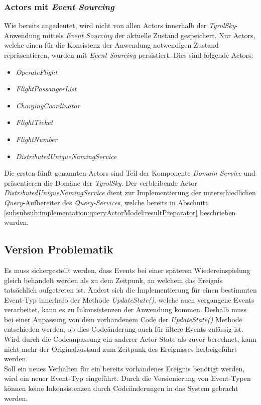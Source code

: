 \subsubsection{Actors mit \textit{Event Sourcing}}
Wie bereits angedeutet, wird nicht von allen Actors innerhalb der \textit{TyrolSky}-Anwendung mittels \textit{Event Sourcing} der aktuelle Zustand gespeichert. Nur Actors, welche einen für die Konsistenz der Anwendung notwendigen Zustand repräsentieren, wurden mit \textit{Event Sourcing} persistiert. Dies sind folgende Actors: 
\begin{itemize}
    \item{\textit{OperateFlight}}
    \item{\textit{FlightPassangerList}}
    \item{\textit{ChargingCoordinator}}
    \item{\textit{FlightTicket}}
    \item{\textit{FlightNumber}}
    \item{\textit{DistributedUniqueNamingService}}
\end{itemize}
Die ersten fünft genannten Actors sind Teil der Komponente \textit{Domain Service} und präsentieren die Domäne der \textit{TyrolSky}. Der verbleibende Actor \textit{DistributedUniqueNamingService} dient zur Implementierung der unterschiedlichen \textit{Query}-Aufbereiter des \textit{Query-Services}, welche bereits in Abschnitt \ref{subsubsub:implementation:queryActorModel:resultPreparator} beschrieben wurden.

\subsection{Version Problematik}
Es muss sichergestellt werden, dass Events bei einer späteren Wiedereinspielung gleich behandelt werden als zu dem Zeitpunk, an welchem das Ereignis tatsächlich aufgetreten ist. Ändert sich die Implementierung für einen bestimmten Event-Typ innerhalb der Methode \textit{UpdateState()}, welche auch vergangene Events verarbeitet, kann es zu Inkonsistenzen der Anwendung kommen. Deshalb muss bei einer Anpassung von dem vorhandenem Code der \textit{UpdateState()} Methode entschieden werden, ob dies Codeänderung auch für ältere Events zulässig ist. Wird durch die Codeanpassung ein anderer Actor State als zuvor berechnet, kann nicht mehr der Originalzustand zum Zeitpunk des Ereignisses herbeigeführt werden. \\
Soll ein neues Verhalten für ein bereits vorhandenes Ereignis benötigt werden, wird ein neuer Event-Typ eingeführt. Durch die Versionierung von Event-Typen können keine Inkonsistenzen durch Codeänderungen in das System gebracht werden. 
